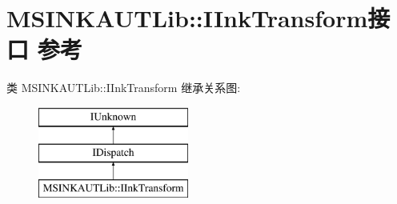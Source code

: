 \hypertarget{interface_m_s_i_n_k_a_u_t_lib_1_1_i_ink_transform}{}\section{M\+S\+I\+N\+K\+A\+U\+T\+Lib\+:\+:I\+Ink\+Transform接口 参考}
\label{interface_m_s_i_n_k_a_u_t_lib_1_1_i_ink_transform}
类 M\+S\+I\+N\+K\+A\+U\+T\+Lib\+:\+:I\+Ink\+Transform 继承关系图\+:\begin{figure}[H]
\begin{center}
\leavevmode
\includegraphics[height=3.000000cm]{interface_m_s_i_n_k_a_u_t_lib_1_1_i_ink_transform}
\end{center}
\end{figure}
